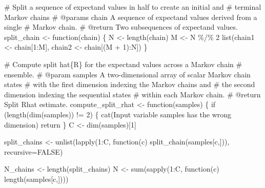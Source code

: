 \documentclass[
  letterpaper,
  DIV=11,
  numbers=noendperiod]{scrartcl}
\newenvironment{Shaded}{\begin{snugshade}}{\end{snugshade}}
\newcommand{\AttributeTok}[1]{\textcolor[rgb]{0.40,0.45,0.13}{#1}}
\newcommand{\CommentTok}[1]{\textcolor[rgb]{0.37,0.37,0.37}{#1}}
\newcommand{\ConstantTok}[1]{\textcolor[rgb]{0.56,0.35,0.01}{#1}}
\newcommand{\ControlFlowTok}[1]{\textcolor[rgb]{0.00,0.23,0.31}{#1}}
\newcommand{\DecValTok}[1]{\textcolor[rgb]{0.68,0.00,0.00}{#1}}
\newcommand{\FunctionTok}[1]{\textcolor[rgb]{0.28,0.35,0.67}{#1}}
\newcommand{\NormalTok}[1]{\textcolor[rgb]{0.00,0.23,0.31}{#1}}
\newcommand{\OtherTok}[1]{\textcolor[rgb]{0.00,0.23,0.31}{#1}}
\newcommand{\SpecialCharTok}[1]{\textcolor[rgb]{0.37,0.37,0.37}{#1}}
\newcommand{\StringTok}[1]{\textcolor[rgb]{0.13,0.47,0.30}{#1}}
\begin{document}
\begin{Shaded}
\begin{Highlighting}[]
\CommentTok{\# Split a sequence of expectand values in half to create an initial and }
\CommentTok{\# terminal Markov chains}
\CommentTok{\# @params chain A sequence of expectand values derived from a single }
\CommentTok{\#               Markov chain.}
\CommentTok{\# @return Two subsequences of expectand values.}
\NormalTok{split\_chain }\OtherTok{\textless{}{-}} \ControlFlowTok{function}\NormalTok{(chain) \{}
\NormalTok{  N }\OtherTok{\textless{}{-}} \FunctionTok{length}\NormalTok{(chain)}
\NormalTok{  M }\OtherTok{\textless{}{-}}\NormalTok{ N }\SpecialCharTok{\%/\%} \DecValTok{2}
  \FunctionTok{list}\NormalTok{(chain1 }\OtherTok{\textless{}{-}}\NormalTok{ chain[}\DecValTok{1}\SpecialCharTok{:}\NormalTok{M], chain2 }\OtherTok{\textless{}{-}}\NormalTok{ chain[(M }\SpecialCharTok{+} \DecValTok{1}\NormalTok{)}\SpecialCharTok{:}\NormalTok{N])}
\NormalTok{\}}

\CommentTok{\# Compute split hat\{R\} for the expectand values across a Markov chain }
\CommentTok{\# ensemble.}
\CommentTok{\# @param samples A two{-}dimensional array of scalar Markov chain states }
\CommentTok{\#                with the first dimension indexing the Markov chains and }
\CommentTok{\#                the second dimension indexing the sequential states }
\CommentTok{\#                within each Markov chain.}
\CommentTok{\# @return Split Rhat estimate.}
\NormalTok{compute\_split\_rhat }\OtherTok{\textless{}{-}} \ControlFlowTok{function}\NormalTok{(samples) \{}
  \ControlFlowTok{if}\NormalTok{ (}\FunctionTok{length}\NormalTok{(}\FunctionTok{dim}\NormalTok{(samples)) }\SpecialCharTok{!=} \DecValTok{2}\NormalTok{) \{}
    \FunctionTok{cat}\NormalTok{(}\StringTok{\textquotesingle{}Input variable \textasciigrave{}samples\textasciigrave{} has the wrong dimension\textquotesingle{}}\NormalTok{)}
\NormalTok{    return}
\NormalTok{  \}}
\NormalTok{  C }\OtherTok{\textless{}{-}} \FunctionTok{dim}\NormalTok{(samples)[}\DecValTok{1}\NormalTok{]}
  
\NormalTok{  split\_chains }\OtherTok{\textless{}{-}} \FunctionTok{unlist}\NormalTok{(}\FunctionTok{lapply}\NormalTok{(}\DecValTok{1}\SpecialCharTok{:}\NormalTok{C, }
                                \ControlFlowTok{function}\NormalTok{(c) }\FunctionTok{split\_chain}\NormalTok{(samples[c,])),}
                         \AttributeTok{recursive=}\ConstantTok{FALSE}\NormalTok{)}

\NormalTok{  N\_chains }\OtherTok{\textless{}{-}} \FunctionTok{length}\NormalTok{(split\_chains)}
\NormalTok{  N }\OtherTok{\textless{}{-}} \FunctionTok{sum}\NormalTok{(}\FunctionTok{sapply}\NormalTok{(}\DecValTok{1}\SpecialCharTok{:}\NormalTok{C, }\ControlFlowTok{function}\NormalTok{(c) }\FunctionTok{length}\NormalTok{(samples[c,])))}


\end{Highlighting}
\end{Shaded}
\end{document}
